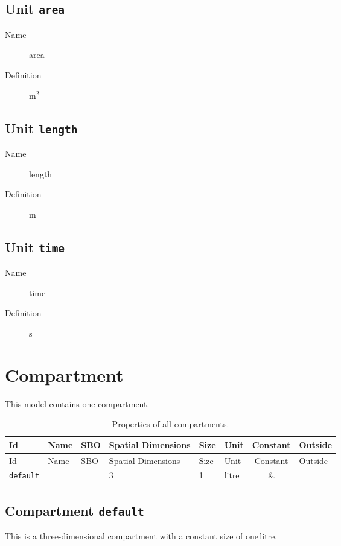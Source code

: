 \documentclass[11pt,twoside,bibtotoc,a4paper]{scrartcl}
\newcommand{\yes}{\parbox[c]{1.3em}{\Large\Square\hspace{-.65em}\ding{51}}}
\begin{document}
\subsection{Unit \texttt{area}}
\begin{description}
\item[Name] area
\item[Definition] $\mathrm{m}^{2}$
\end{description}

\subsection{Unit \texttt{length}}
\begin{description}
\item[Name] length
\item[Definition] $\mathrm{m}$
\end{description}

\subsection{Unit \texttt{time}}
\begin{description}
\item[Name] time
\item[Definition] $\mathrm{s}$
\end{description}

\section{Compartment}
This model contains one compartment.
\begin{longtable}[h!]{@{}lllC{2cm}llcl@{}}
\caption{Properties of all compartments.}\\
\toprule
Id&Name&SBO&Spatial Dimensions&Size&Unit&Constant&Outside\\
\midrule
\endfirsthead
\toprule
Id&Name&SBO&Spatial Dimensions&Size&Unit&Constant&Outside\\
\midrule
\endhead
\texttt{default}&&&3&1&litre&\yes&\texttt{}\\
\bottomrule\end{longtable}


\subsection{Compartment \texttt{default}}
This is a three-dimensional compartment with a constant size of one\,litre.
\end{document}
